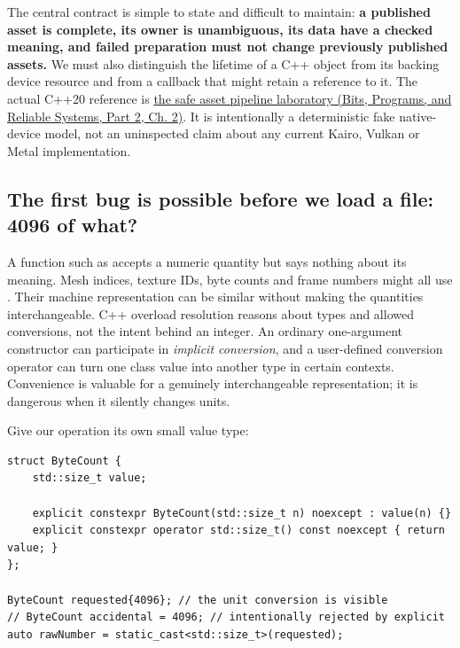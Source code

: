 The central contract is simple to state and difficult to maintain: \textbf{a published asset is complete, its owner is unambiguous, its data have a checked meaning, and failed preparation must not change previously published assets.} We must also distinguish the lifetime of a C++ object from its backing device resource and from a callback that might retain a reference to it. The actual C++20 reference is \href{../01-Bits-Programs-and-Reliable-Systems-P02/main.pdf\#nameddest=source-file-32e93bc026677e074aaa7771}{the safe asset pipeline laboratory (Bits, Programs, and Reliable Systems, Part 2, Ch. 2)}. It is intentionally a deterministic fake native-device model, not an uninspected claim about any current Kairo, Vulkan or Metal implementation.

\subsection{The first bug is possible before we load a file: 4096 of what?}\label{01-foundations-i-ch004-the-first-bug-is-possible-before-we-load-a-file-4096-of-what}

\hypertarget{01-foundations-i-ch004-the-first-bug-is-possible-before-we-load-a-file-4096-of-what}{}

A function such as  accepts a numeric quantity but says nothing about its meaning. Mesh indices, texture IDs, byte counts and frame numbers might all use . Their machine representation can be similar without making the quantities interchangeable. C++ overload resolution reasons about types and allowed conversions, not the intent behind an integer. An ordinary one-argument constructor can participate in \emph{implicit conversion}, and a user-defined conversion operator can turn one class value into another type in certain contexts. Convenience is valuable for a genuinely interchangeable representation; it is dangerous when it silently changes units.

Give our operation its own small value type:

\begin{verbatim}
struct ByteCount {
    std::size_t value;

    explicit constexpr ByteCount(std::size_t n) noexcept : value(n) {}
    explicit constexpr operator std::size_t() const noexcept { return value; }
};

ByteCount requested{4096}; // the unit conversion is visible
// ByteCount accidental = 4096; // intentionally rejected by explicit
auto rawNumber = static_cast<std::size_t>(requested);
\end{verbatim}

